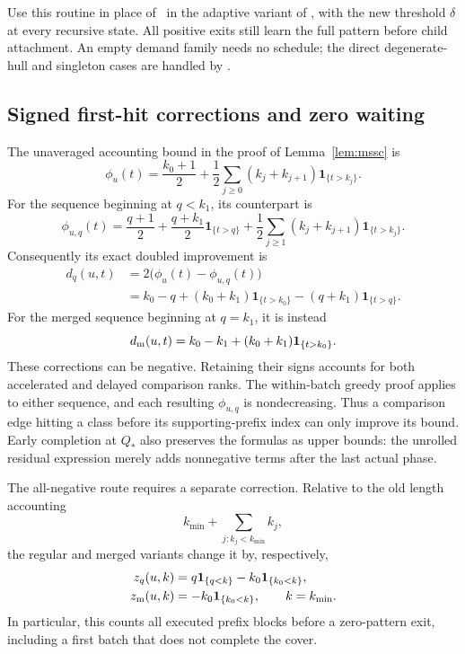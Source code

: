 Use this routine in place of \BatchOrders\ in the adaptive variant
of \ExpectedTree, with the new threshold $\delta$ at every recursive
state. All positive exits still learn the full pattern before child
attachment. An empty demand family needs no schedule; the direct
degenerate-hull and singleton cases are handled by \ExpectedTree.

\subsection{Signed first-hit corrections and zero waiting}

The unaveraged accounting bound in the proof of
Lemma~\ref{lem:mssc} is
\[
 \phi_u(t)=\frac{k_0+1}{2}
  +\frac12\sum_{j\ge0}(k_j+k_{j+1})\mathbf1_{\{t>k_j\}}.
\]
For the sequence beginning at $q<k_1$, its counterpart is
\[
 \phi_{u,q}(t)=\frac{q+1}{2}
  +\frac{q+k_1}{2}\mathbf1_{\{t>q\}}
  +\frac12\sum_{j\ge1}(k_j+k_{j+1})\mathbf1_{\{t>k_j\}}.
\]
Consequently its exact doubled improvement is
\begin{equation}\label{eq:first-phase-correction}
 \begin{aligned}
 d_q(u,t)&=2\bigl(\phi_u(t)-\phi_{u,q}(t)\bigr)\\
 &=k_0-q+(k_0+k_1)\mathbf1_{\{t>k_0\}}
              -(q+k_1)\mathbf1_{\{t>q\}}.
 \end{aligned}
\end{equation}
For the merged sequence beginning at $q=k_1$, it is instead
\begin{equation}\label{eq:merged-phase-correction}
 d_{\rm m}(u,t)=k_0-k_1+(k_0+k_1)\mathbf1_{\{t>k_0\}}.
\end{equation}
These corrections can be negative. Retaining their signs accounts
for both accelerated and delayed comparison ranks. The within-batch
greedy proof applies to either sequence, and each resulting
$\phi_{u,q}$ is nondecreasing. Thus a comparison edge hitting a class
before its supporting-prefix index can only improve its bound.
Early completion at $Q_*$ also preserves the formulas as upper bounds:
the unrolled residual expression merely adds nonnegative terms after
the last actual phase.

The all-negative route requires a separate correction. Relative to
the old length accounting
\[
 k_{\min}+\sum_{j:k_j<k_{\min}}k_j,
\]
the regular and merged variants change it by, respectively,
\begin{equation}\label{eq:first-phase-zero-correction}
 \begin{aligned}
 z_q(u,k)&=q\mathbf1_{\{q<k\}}-k_0\mathbf1_{\{k_0<k\}},\\
 z_{\rm m}(u,k)&=-k_0\mathbf1_{\{k_0<k\}},
 \qquad k=k_{\min}.
 \end{aligned}
\end{equation}
In particular, this counts all executed prefix blocks before a
zero-pattern exit, including a first batch that does not complete
the cover.

